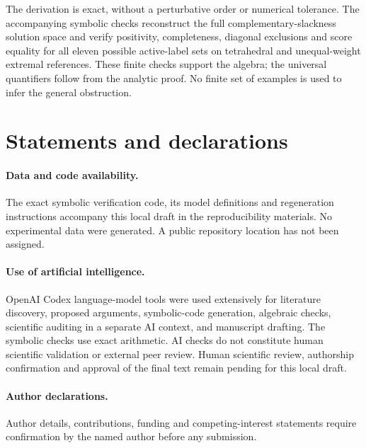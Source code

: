 \documentclass[11pt,a4paper]{article}
\begin{document}
The derivation is exact, without a perturbative order or numerical tolerance.
The accompanying symbolic checks reconstruct the full complementary-slackness
solution space and verify positivity, completeness, diagonal exclusions and
score equality for all eleven possible active-label sets on tetrahedral and
unequal-weight extremal references. These finite checks support the algebra;
the universal quantifiers follow from the analytic proof. No finite set of
examples is used to infer the general obstruction.

\section*{Statements and declarations}

\paragraph{Data and code availability.}
The exact symbolic verification code, its model definitions and regeneration
instructions accompany this local draft in the reproducibility materials.
No experimental data were generated. A public repository location has not
been assigned.

\paragraph{Use of artificial intelligence.}
OpenAI Codex language-model tools were used extensively for literature
discovery, proposed arguments, symbolic-code generation, algebraic checks,
scientific auditing in a separate AI context, and manuscript drafting. The
symbolic checks use exact arithmetic. AI checks do not constitute human
scientific validation or external peer review. Human scientific review,
authorship confirmation and approval of the final text remain pending for
this local draft.

\paragraph{Author declarations.}
Author details, contributions, funding and competing-interest statements require
confirmation by the named author before any submission.



\end{document}
